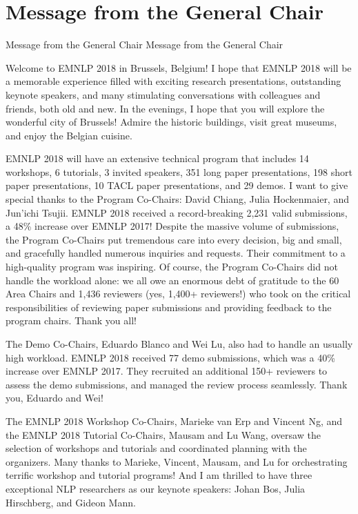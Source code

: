 \section{Message from the General Chair}\vspace{2em}
\setheaders%
    {Message from the General Chair}%
    {Message from the General Chair}
\thispagestyle{emptyheader}

\setlength{\parskip}{1ex}

Welcome to EMNLP 2018 in Brussels, Belgium! I hope that EMNLP 2018
will be a memorable experience filled with exciting research
presentations, outstanding keynote speakers, and many stimulating
conversations with colleagues and friends, both old and new. In the
evenings, I hope that you will explore the wonderful city of Brussels!
Admire the historic buildings, visit great museums, and enjoy the
Belgian cuisine.

EMNLP 2018 will have an extensive technical program that includes 14
workshops, 6 tutorials, 3 invited speakers, 351 long paper
presentations, 198 short paper presentations, 10 TACL paper
presentations, and 29 demos. I want to give special thanks to the
Program Co-Chairs: David Chiang, Julia Hockenmaier, and Jun'ichi
Tsujii. EMNLP 2018 received a record-breaking 2,231 valid submissions,
a 48\% increase over EMNLP 2017! Despite the massive volume of
submissions, the Program Co-Chairs put tremendous care into every decision, big and
small, and gracefully handled numerous inquiries and requests. Their
commitment to a high-quality program was inspiring. Of course, the Program Co-Chairs did not handle the workload alone: we all owe an enormous debt
of gratitude to the 60 Area Chairs and 1,436 reviewers (yes, 1,400+
reviewers!) who took on the critical responsibilities of reviewing
paper submissions and providing feedback to the program chairs. Thank
you all!

The Demo Co-Chairs, Eduardo Blanco and Wei Lu, also had to handle an
usually high workload. EMNLP 2018 received 77 demo submissions, which
was a 40\% increase over EMNLP 2017. They recruited an additional 150+
reviewers to assess the demo submissions, and managed the review
process seamlessly. Thank you, Eduardo and Wei!

The EMNLP 2018 Workshop Co-Chairs, Marieke van Erp and Vincent Ng, and
the EMNLP 2018 Tutorial Co-Chairs, Mausam and Lu Wang, oversaw the
selection of workshops and tutorials and coordinated planning with the
organizers. Many thanks to Marieke, Vincent, Mausam, and Lu for
orchestrating terrific workshop and tutorial programs!
And I am thrilled to have three exceptional NLP researchers as our
keynote speakers: Johan Bos, Julia Hirschberg, and Gideon Mann. 

